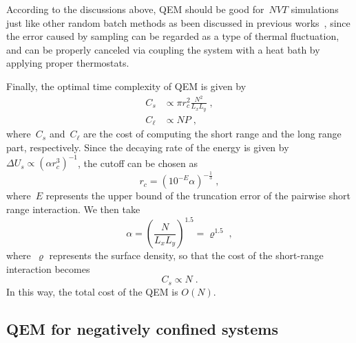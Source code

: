 According to the discussions above, QEM should be good for~$NVT$ simulations just like other random batch methods \cite{jin2020random, jin2021random} as been discussed in previous works~\cite{jin2021convergence,li2019stochastic,li2020random}, since the error caused by sampling can be regarded as a type of thermal fluctuation, and can be properly canceled via coupling the system with a heat bath by applying proper thermostats.

Finally, the optimal time complexity of QEM is given by
\begin{align}
    C_s & \propto \pi r_c^2 \frac{N^2}{L_x L_y}\;,\\
    C_\ell & \propto N P\;,
\end{align}
where~$C_s$ and~$C_\ell$ are the cost of computing the short range and the long range part, respectively.
Since the decaying rate of the energy is given by~$\Delta U_s \propto (\alpha r_c^3)^{-1}$, the cutoff can be chosen as
\begin{equation}
    r_c = (10^{-E} \alpha)^{-\frac{1}{3}}\;,
\end{equation}
where~$E$ represents the upper bound of the truncation error of the pairwise short range interaction.
We then take
\begin{equation}\label{eq:alphs-select}
    \alpha = \left(\frac{N}{L_x L_y} \right)^{1.5} = {\varrho}^{1.5}\;,
\end{equation}
where~$\varrho$ represents the surface density, so that the cost of the short-range interaction becomes
\begin{equation}
    C_s \propto  N\;.
\end{equation}
In this way, the total cost of the QEM is $O(N)$.


\subsection{QEM for negatively confined systems}

